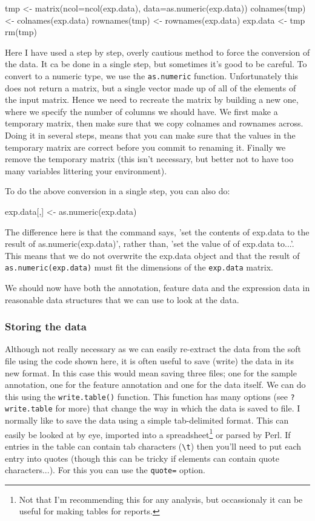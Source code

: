 \documentclass[11pt]{article}
\begin{document}
\begin{rcode}
  tmp <- matrix(ncol=ncol(exp.data), data=as.numeric(exp.data))
  colnames(tmp) <- colnames(exp.data)
  rownames(tmp) <- rownames(exp.data)
  exp.data <- tmp
  rm(tmp)
\end{rcode}

Here I have used a step by step, overly cautious method to force the conversion of the
data. It ca be done in a single step, but sometimes it's good to be
careful. To convert to a numeric type, we use the \texttt{as.numeric} function.
Unfortunately this does not return a matrix, but a single vector made up of
all of the elements of the input matrix. Hence we need to recreate the matrix
by building a new one, where we specify the number of columns we should have.
We first make a temporary matrix, then make sure that we copy colnames
and rownames across. Doing it in several steps, means that you can make sure
that the values in the temporary matrix are correct before you commit to renaming
it. Finally we remove the temporary matrix (this isn't necessary, but better not
to have too many variables littering your environment).

To do the above conversion in a single step, you can also do:

\begin{rcode}
exp.data[,] <- as.numeric(exp.data)
\end{rcode}

The difference here is that the command says, 'set the contents of exp.data
to the result of as.numeric(exp.data)', rather than, 'set the value of of
exp.data to...'. This means that we do not overwrite the exp.data object
and that the result of \texttt{as.numeric(exp.data)} must fit the dimensions
of the \texttt{exp.data} matrix. 

We should now have both the annotation, feature data and the expression
data in reasonable data structures that we can use to look at the data.

\subsubsection{Storing the data}
\label{sec-1-2-3}
Although not really necessary as we can easily re-extract the
data from the soft file using the code shown here, it is often
useful to save (write) the data in its new format. In this case
this would mean saving three files; one for the sample annotation,
one for the feature annotation and one for the data itself.
We can do this using the \texttt{write.table()} function. This
function has many options (see \texttt{?write.table} for more)
that change the way in which the data is saved to file. I normally
like to save the data using a simple tab-delimited format. This
can easily be looked at by eye, imported into a spreadsheet\footnote{
Not that I'm recommending this for any analysis, but occassionaly
it can be useful for making tables for reports.} or parsed
by Perl. If entries in the table can contain tab characters (\verb|\t|)
then you'll need to put each entry into quotes (though this can
be tricky if elements can contain quote characters...). For this you can
use the \texttt{quote=} option.
\end{document}
